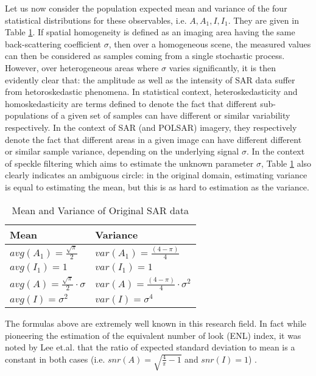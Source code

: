 Let us now consider the population expected mean and variance of the four statistical distributions for these observables, i.e. $A, A_1, I, I_1$.
They are given in Table \ref{tbl:orginal_sar_avg_var}. 
If spatial homogeneity is defined as an imaging area having the same back-scattering coefficient $\sigma$,
  then over a homogeneous scene, the measured values can then be considered as samples coming from a single stochastic process.
However, over heterogeneous areas where $\sigma$ varies significantly,
  it is then evidently clear that: the amplitude  as well as the intensity of SAR data suffer from hetoroskedastic phenomena. 
In statistical context, heteroskedasticity and homoskedasticity are terms defined to denote the fact that different sub-populations of a given set of samples can have different or similar variability respectively.
In the context of SAR (and POLSAR) imagery, they respectively denote the fact that different areas in a given image can have different different or similar sample variance, depending on the underlying signal $\sigma$.
In the context of speckle filtering which aims to estimate the unknown parameter $\sigma$,
  Table \ref{tbl:orginal_sar_avg_var} also clearly indicates an ambiguous circle:
in the original domain, estimating variance is equal to estimating the mean, but this is as hard to estimation as the variance.

\begin{table}[!h]
\normalsize
\centering
\caption{ Mean and Variance of Original SAR data }
\label{tbl:orginal_sar_avg_var}
\begin{tabular}{|l|l|}
\hline
Mean & Variance \\
\hline
$avg(A_1) = \frac{ \sqrt{\pi}}{2}$ & $var(A_1) = \frac{(4-\pi)}{4}$ \\
$avg(I_1) = 1$ & $var(I_1) = 1$ \\
$avg(A) = \frac{\sqrt{\pi}}{2} \cdot \sigma $ & $var(A) = \frac{(4-\pi)}{4} \cdot \sigma^2 $ \\
$avg(I) = \sigma^2 $ & $ var(I) = \sigma^4$ \\
\hline 
\end{tabular}
\end{table}

The formulas above are extremely well known in this research field. 
In fact while pioneering the estimation of the equivalent number of look (ENL) index, 
 it was noted by Lee et.al. that the ratio of expected standard deviation to mean is a constant in both cases (i.e. $snr(A)=\sqrt{\frac{4}{\pi}-1}$ and $snr(I)=1$) \cite{Lee_1992_IMA_298}.

